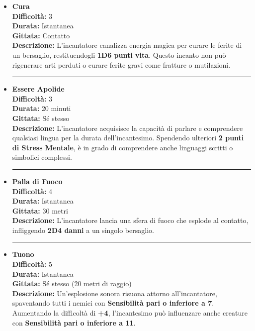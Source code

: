 \documentclass[./magie.tex]{subfiles}
\begin{document}
\begin{itemize}

\item \textbf{Cura} \\
\textbf{Difficoltà:} 3 \\
\textbf{Durata:} Istantanea \\
\textbf{Gittata:} Contatto \\
\textbf{Descrizione:} L'incantatore canalizza energia magica per curare le ferite di un bersaglio, restituendogli \textbf{1D6 punti vita}. Questo incanto non può rigenerare arti perduti o curare ferite gravi come fratture o mutilazioni.

\vspace{0.2cm}
\noindent
\begin{center}
\rule{\textwidth}{0.4pt} 
\end{center}
\vspace{0.2cm}

\item \textbf{Essere Apolide} \\
\textbf{Difficoltà:} 3 \\
\textbf{Durata:} 20 minuti \\
\textbf{Gittata:} Sé stesso \\
\textbf{Descrizione:} L'incantatore acquisisce la capacità di parlare e comprendere qualsiasi lingua per la durata dell'incantesimo. Spendendo ulteriori \textbf{2 punti di Stress Mentale}, è in grado di comprendere anche linguaggi scritti o simbolici complessi.

\vspace{0.2cm}
\noindent
\begin{center}
\rule{\textwidth}{0.4pt} 
\end{center}
\vspace{0.2cm}

\item \textbf{Palla di Fuoco} \\
\textbf{Difficoltà:} 4 \\
\textbf{Durata:} Istantanea \\
\textbf{Gittata:} 30 metri \\
\textbf{Descrizione:} L'incantatore lancia una sfera di fuoco che esplode al contatto, infliggendo \textbf{2D4 danni} a un singolo bersaglio.

\vspace{0.2cm}
\noindent
\begin{center}
\rule{\textwidth}{0.4pt} 
\end{center}
\vspace{0.2cm}
\clearpage
\item \textbf{Tuono} \\
\textbf{Difficoltà:} 5 \\
\textbf{Durata:} Istantanea \\
\textbf{Gittata:} Sé stesso (20 metri di raggio) \\
\textbf{Descrizione:} Un'esplosione sonora risuona attorno all'incantatore, spaventando tutti i nemici con \textbf{Sensibilità pari o inferiore a 7}. Aumentando la difficoltà di \textbf{+4}, l'incantesimo può influenzare anche creature con \textbf{Sensibilità pari o inferiore a 11}.


\end{itemize}
\end{document}
